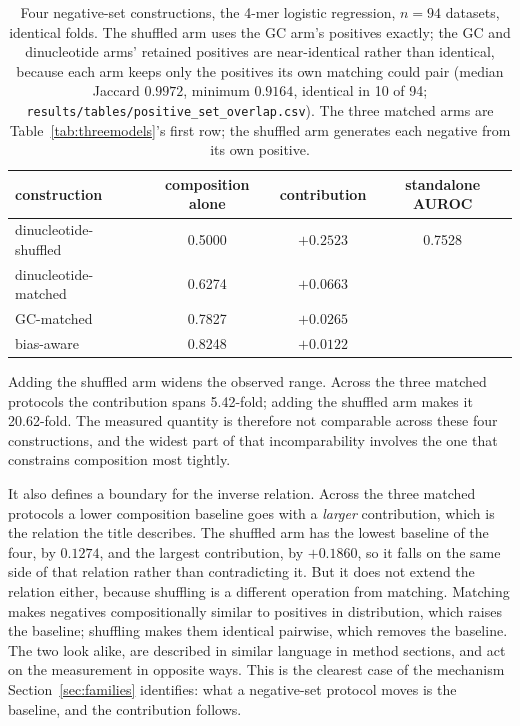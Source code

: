 \begin{table}[htbp]
\centering
\caption{Four negative-set constructions, the 4-mer logistic regression, $n=94$ datasets,
identical folds. The shuffled arm uses the GC arm's positives exactly; the GC and dinucleotide
arms' retained positives are near-identical rather than identical, because each arm keeps only
the positives its own matching could pair (median Jaccard $0.9972$, minimum $0.9164$, identical
in 10 of 94; \texttt{results/tables/\allowbreak positive\_set\_overlap.csv}). The three matched arms are Table~\ref{tab:threemodels}'s first row; the
shuffled arm generates each negative from its own positive.}
\label{tab:shuffled}
\begin{tabular}{lccc}
\toprule
construction & composition alone & contribution & standalone AUROC \\
\midrule
dinucleotide-shuffled & 0.5000 & $+0.2523$ & 0.7528 \\
dinucleotide-matched & 0.6274 & $+0.0663$ & \\
GC-matched & 0.7827 & $+0.0265$ & \\
bias-aware & 0.8248 & $+0.0122$ & \\
\bottomrule
\end{tabular}
\end{table}

Adding the shuffled arm widens the observed range. Across the three matched protocols the contribution spans
5.42-fold; adding the shuffled arm makes it 20.62-fold. The measured quantity is therefore not
comparable across these four constructions, and the widest part of that incomparability involves
the one that constrains composition most tightly.

It also defines a boundary for the inverse relation. Across the three matched
protocols a lower composition baseline goes with a \emph{larger} contribution, which is the
relation the title describes. The shuffled arm has the lowest baseline of the four, by $0.1274$,
and the largest contribution, by $+0.1860$, so it falls on the same side of that relation rather
than contradicting it. But it does not extend the relation either, because shuffling is a
different operation from matching. Matching makes negatives compositionally similar to positives
in distribution, which raises the baseline; shuffling makes them identical pairwise, which
removes the baseline. The two look alike, are described in similar language in method sections,
and act on the measurement in opposite ways. This is the clearest case of the mechanism
Section~\ref{sec:families} identifies: what a negative-set protocol moves is the baseline, and
the contribution follows.

